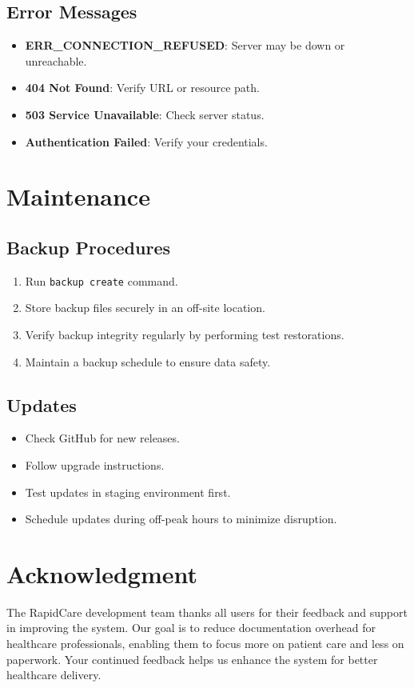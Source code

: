 \documentclass[12pt, titlepage]{article}
\begin{document}
\subsection{Error Messages}
\begin{itemize}
\item \textbf{ERR\_CONNECTION\_REFUSED}: Server may be down or unreachable.
\item \textbf{404 Not Found}: Verify URL or resource path.
\item \textbf{503 Service Unavailable}: Check server status.
\item \textbf{Authentication Failed}: Verify your credentials.
\end{itemize}

\section{Maintenance}
\subsection{Backup Procedures}
\begin{enumerate}
\item Run \texttt{backup create} command.
\item Store backup files securely in an off-site location.
\item Verify backup integrity regularly by performing test restorations.
\item Maintain a backup schedule to ensure data safety.
\end{enumerate}

\subsection{Updates}
\begin{itemize}
\item Check GitHub for new releases.
\item Follow upgrade instructions.
\item Test updates in staging environment first.
\item Schedule updates during off-peak hours to minimize disruption.
\end{itemize}

\section*{Acknowledgment}
The RapidCare development team thanks all users for their feedback and support in improving the system. Our goal is to reduce documentation overhead for healthcare professionals, enabling them to focus more on patient care and less on paperwork. Your continued feedback helps us enhance the system for better healthcare delivery.
\end{document}

